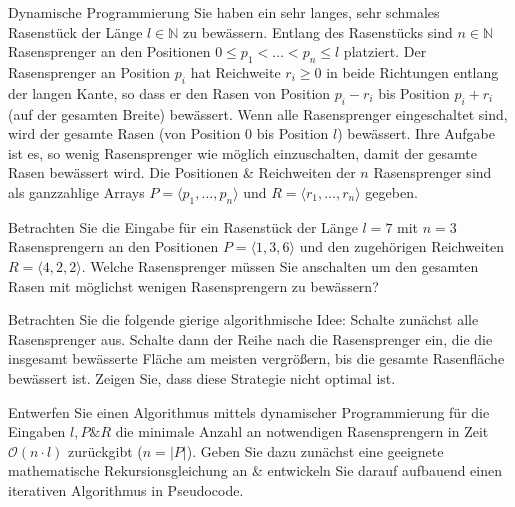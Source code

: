 \documentclass{article}
\begin{document}
\begin{eexercises}{Dynamische Programmierung}{
    Sie haben ein sehr langes, sehr schmales Rasenstück der Länge $l \in \mathbb{N}$ zu bewässern. Entlang des Rasenstücks sind $n \in \mathbb{N}$ Rasensprenger an den Positionen $0 \leq p_1 < \ldots < p_n \leq l$ platziert. Der Rasensprenger an Position $p_i$ hat Reichweite $r_i \geq 0$ in beide Richtungen entlang der langen Kante, so dass er den Rasen von Position $p_i - r_i$ bis Position $p_i + r_i$ (auf der gesamten Breite) bewässert. Wenn alle Rasensprenger eingeschaltet sind, wird der gesamte Rasen (von Position 0 bis Position $l$) bewässert. Ihre Aufgabe ist es, so wenig Rasensprenger wie möglich einzuschalten, damit der gesamte Rasen bewässert wird. Die Positionen \& Reichweiten der $n$ Rasensprenger sind als ganzzahlige Arrays $P = \langle p_1, \ldots, p_n \rangle$ und $R = \langle r_1, \ldots, r_n \rangle$ gegeben.
  }
  \item Betrachten Sie die Eingabe für ein Rasenstück der Länge $l = 7$ mit $n = 3$ Rasensprengern an den Positionen $P = \langle 1,3,6 \rangle$ und den zugehörigen Reichweiten $R = \langle 4,2,2 \rangle$. Welche Rasensprenger müssen Sie anschalten um den gesamten Rasen mit möglichst wenigen Rasensprengern zu bewässern?
  \item Betrachten Sie die folgende gierige algorithmische Idee: Schalte zunächst alle Rasensprenger aus. Schalte dann der Reihe nach die Rasensprenger ein, die die insgesamt bewässerte Fläche am meisten vergrößern, bis die gesamte Rasenfläche bewässert ist. Zeigen Sie, dass diese Strategie nicht optimal ist.
  \item Entwerfen Sie einen Algorithmus mittels dynamischer Programmierung für die Eingaben $l, P \& R$ die minimale Anzahl an notwendigen Rasensprengern in Zeit $\mathcal{O}(n \cdot l)$ zurückgibt ($n = \lvert P \rvert$). Geben Sie dazu zunächst eine geeignete mathematische Rekursionsgleichung an \& entwickeln Sie darauf aufbauend einen iterativen Algorithmus in Pseudocode.
\end{eexercises}
\end{document}
